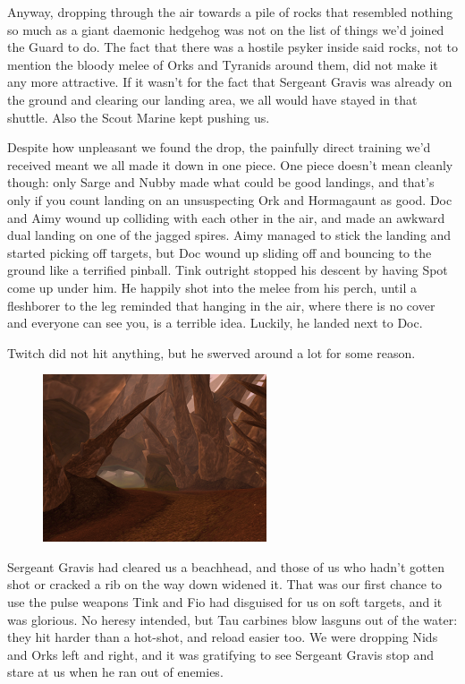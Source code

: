 Anyway, dropping through the air towards a pile of rocks that resembled nothing so much as a giant daemonic hedgehog was not on the list of things we'd joined the Guard to do. 
The fact that there was a hostile psyker inside said rocks, not to mention the bloody melee of Orks and Tyranids around them, did not make it any more attractive. 
If it wasn't for the fact that Sergeant Gravis was already on the ground and clearing our landing area, we all would have stayed in that shuttle. 
Also the Scout Marine kept pushing us.

Despite how unpleasant we found the drop, the painfully direct training we'd received meant we all made it down in one piece. 
One piece doesn't mean cleanly though: 
only Sarge and Nubby made what could be good landings, and that's only if you count landing on an unsuspecting Ork and Hormagaunt as good. 
Doc and Aimy wound up colliding with each other in the air, and made an awkward dual landing on one of the jagged spires. 
Aimy managed to stick the landing and started picking off targets, but Doc wound up sliding off and bouncing to the ground like a terrified pinball. 
Tink outright stopped his descent by having Spot come up under him. 
He happily shot into the melee from his perch, until a fleshborer to the leg reminded that hanging in the air, where there is no cover and everyone can see you, is a terrible idea. 
Luckily, he landed next to Doc.

Twitch did not hit anything, but he swerved around a lot for some reason.

\begin{figure}
	\begin{center}
		\includegraphics[width=\figwidth]{pics/12/37.png}
	\end{center}
\end{figure}
Sergeant Gravis had cleared us a beachhead, and those of us who hadn't gotten shot or cracked a rib on the way down widened it. 
That was our first chance to use the pulse weapons Tink and Fio had disguised for us on soft targets, and it was glorious. 
No heresy intended, but Tau carbines blow lasguns out of the water: 
they hit harder than a hot-shot, and reload easier too. 
We were dropping Nids and Orks left and right, and it was gratifying to see Sergeant Gravis stop and stare at us when he ran out of enemies.

